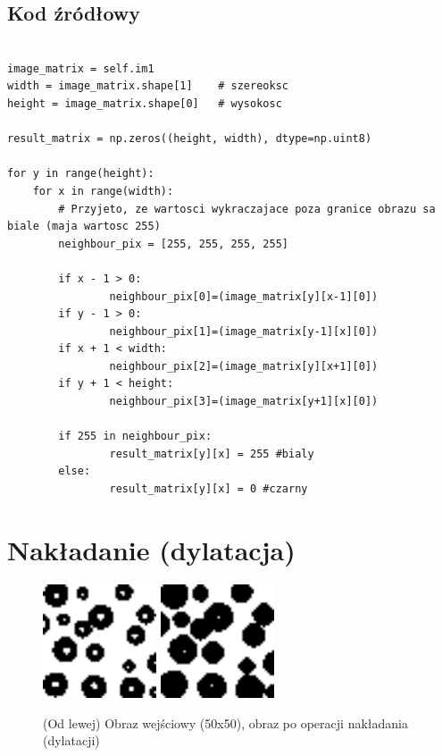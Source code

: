 \documentclass[final,a4paper,openany,12pt]{mwbk}
\begin{document}
\subsection*{Kod źródłowy}

\begin{lstlisting}[caption= Operacja okrawania (erozji) na obrazie binarnym]

image_matrix = self.im1
width = image_matrix.shape[1]    # szereoksc
height = image_matrix.shape[0]   # wysokosc

result_matrix = np.zeros((height, width), dtype=np.uint8)

for y in range(height):
    for x in range(width):  
        # Przyjeto, ze wartosci wykraczajace poza granice obrazu sa biale (maja wartosc 255)
        neighbour_pix = [255, 255, 255, 255]

        if x - 1 > 0:
                neighbour_pix[0]=(image_matrix[y][x-1][0])
        if y - 1 > 0:
                neighbour_pix[1]=(image_matrix[y-1][x][0])
        if x + 1 < width:
                neighbour_pix[2]=(image_matrix[y][x+1][0])
        if y + 1 < height:
                neighbour_pix[3]=(image_matrix[y+1][x][0])

        if 255 in neighbour_pix:
                result_matrix[y][x] = 255 #bialy
        else:
                result_matrix[y][x] = 0 #czarny   

\end{lstlisting}

\section{ Nakładanie (dylatacja)}

\begin{figure}[H]
	\begin{center}
		\includegraphics[width=0.3\textwidth]{1/1Bin_D_Original}
		\includegraphics[width=0.3\textwidth]{1/1Bin_D_Result}
	\end{center}
	\caption{(Od lewej) Obraz wejściowy (50x50), obraz po operacji nakładania (dylatacji) }
\end{figure}
\end{document}
